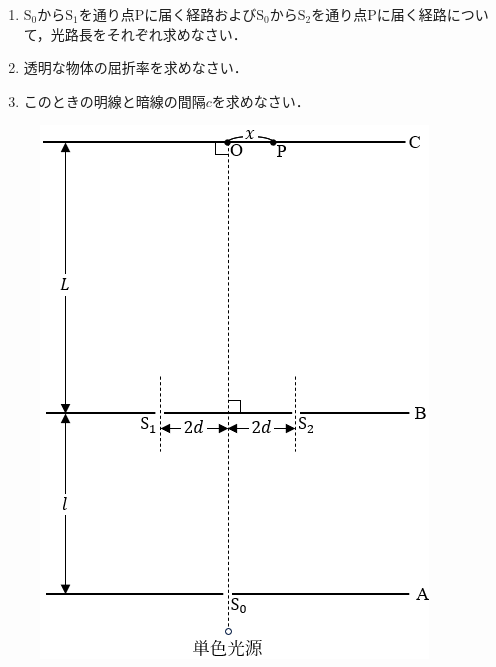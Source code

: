 \begin{enumerate}[（1）]
  \setlength{\leftskip}{-1.5zw}
  \setlength{\itemindent}{1zw}\setlength{\labelsep}{0.5zw}
  \setlength{\labelwidth}{1zw}\setlength{\leftmargin}{1zw}
  \setlength{\itemsep}{0.5\baselineskip}
  \addtocounter{enumi}{4}
  \item $\text{S}_0$から$\text{S}_1$を通り点Pに届く経路および$\text{S}_0$から$\text{S}_2$を通り点Pに届く経路について，光路長をそれぞれ求めなさい．
  \item 透明な物体の屈折率\nn を求めなさい．
  \item このときの明線と暗線の間隔$c$を求めなさい．
\end{enumerate}

\begin{figure}[H]
  \centering
  \begin{minipage}{.45\columnwidth}
    \centering
    \includegraphics[width=\columnwidth]{../graphs/yokoichi_23_3-1.png}

\end{minipage}
\end{figure}
